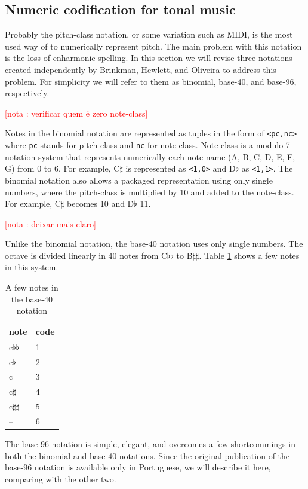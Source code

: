 \documentclass{article}
\newcounter{notacounter}
\newcommand{\nota}[1]{
  \addtocounter{notacounter}{1}
  \textcolor{red}{[nota \arabic{notacounter}: #1]}
}
\begin{document}
\subsection{Numeric codification for tonal music}
\label{sec:codificacao-jamary}

Probably the pitch-class notation, or some variation such as MIDI, is
the most used way of to numerically represent pitch. The main problem
with this notation is the loss of enharmonic spelling. In this section
we will revise three notations created independently by Brinkman,
Hewlett, and Oliveira \cite{brinkman86:_binom_repres_of_pitch_for,
  hewlett92:base40, oliveira01:codificacao} to address this problem.
For simplicity we will refer to them as binomial, base-40, and
base-96, respectively.

\nota{verificar quem é zero note-class}

Notes in the binomial notation are represented as tuples in the form
of \texttt{<pc,nc>} where \texttt{pc} stands for pitch-class and
\texttt{nc} for note-class. Note-class is a modulo 7 notation system
that represents numerically each note name (A, B, C, D, E, F, G) from
0 to 6. For example, C$\sharp$ is represented as \texttt{<1,0>} and
D$\flat$ as \texttt{<1,1>}. The binomial notation also allows a
packaged representation using only single numbers, where the
pitch-class is multiplied by 10 and added to the note-class. For
example, C$\sharp$ becomes 10 and D$\flat$ 11. \nota{deixar mais
  claro}

Unlike the binomial notation, the base-40 notation uses only single
numbers. The octave is divided linearly in 40 notes from C$\flat\flat$
to B$\sharp\sharp$. Table \ref{tab:base40} shows a few notes in this
system.

\begin{table}
  \centering
  \begin{tabular}{l|l}
    note & code \\
    \hline
    c$\flat\flat$ & 1 \\
    c$\flat$ & 2 \\
    c & 3 \\
    c$\sharp$ & 4 \\
    c$\sharp\sharp$ & 5 \\
    -- & 6 \\
  \end{tabular}
  \caption{A few notes in the base-40 notation}
  \label{tab:base40}
\end{table}

The base-96 notation is simple, elegant, and overcomes a few
shortcommings in both the binomial and base-40 notations. Since the
original publication of the base-96 notation is available only in
Portuguese, we will describe it here, comparing with the other
two.
\end{document}
